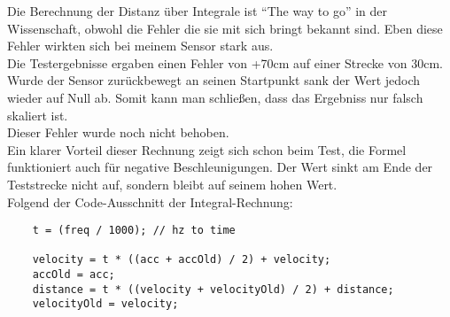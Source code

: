 Die Berechnung der Distanz über Integrale ist ``The way to go''
in der Wissenschaft, obwohl die Fehler die sie mit sich bringt
bekannt sind. Eben diese Fehler wirkten sich bei meinem Sensor
stark aus.\\
Die Testergebnisse ergaben einen Fehler von +70cm auf einer Strecke
von 30cm. Wurde der Sensor zurückbewegt an seinen Startpunkt sank
der Wert jedoch wieder auf Null ab. Somit kann man schließen,
dass das Ergebniss nur falsch skaliert ist.\\
Dieser Fehler wurde noch nicht behoben. \\
Ein klarer Vorteil dieser Rechnung zeigt sich schon beim Test,
die Formel funktioniert auch für negative Beschleunigungen.
Der Wert sinkt am Ende der Teststrecke nicht auf, sondern bleibt
auf seinem hohen Wert.\\
Folgend der Code-Ausschnitt der Integral-Rechnung:
\begin{verbatim}
    t = (freq / 1000); // hz to time

    velocity = t * ((acc + accOld) / 2) + velocity;
    accOld = acc;
    distance = t * ((velocity + velocityOld) / 2) + distance;
    velocityOld = velocity;  
\end{verbatim}